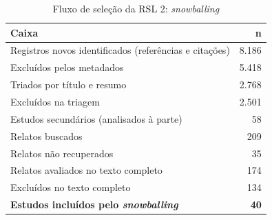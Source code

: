 \begin{table}[htbp]
\centering
\caption{Fluxo de seleção da RSL 2: \textit{snowballing}}
\label{tab:snowball-rsl2}
\small
\begin{tabular}{p{11.7cm}r}
\hline
\textbf{Caixa} & \textbf{n} \\
\hline
Registros novos identificados (referências e citações) & 8.186 \\
Excluídos pelos metadados & 5.418 \\
Triados por título e resumo & 2.768 \\
Excluídos na triagem & 2.501 \\
Estudos secundários (analisados à parte) & 58 \\
Relatos buscados & 209 \\
Relatos não recuperados & 35 \\
Relatos avaliados no texto completo & 174 \\
Excluídos no texto completo & 134 \\
\textbf{Estudos incluídos pelo \textit{snowballing}} & \textbf{40} \\
\hline
\end{tabular}
\end{table}
